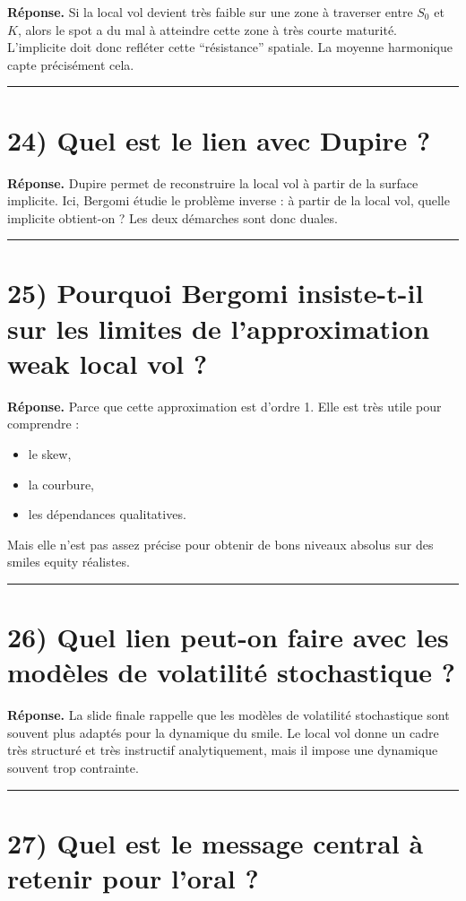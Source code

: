 \documentclass[11pt,a4paper]{article}
\begin{document}
\textbf{Réponse.}  
Si la local vol devient très faible sur une zone à traverser entre \(S_0\) et \(K\), alors le spot a du mal à atteindre cette zone à très courte maturité. L’implicite doit donc refléter cette “résistance” spatiale. La moyenne harmonique capte précisément cela.

\bigskip\hrule\bigskip

\section{24) Quel est le lien avec Dupire ?}

\textbf{Réponse.}  
Dupire permet de reconstruire la local vol à partir de la surface implicite.  
Ici, Bergomi étudie le problème inverse : à partir de la local vol, quelle implicite obtient-on ?  
Les deux démarches sont donc duales.

\bigskip\hrule\bigskip

\section{25) Pourquoi Bergomi insiste-t-il sur les limites de l’approximation weak local vol ?}

\textbf{Réponse.}  
Parce que cette approximation est d’ordre 1.  
Elle est très utile pour comprendre :
\begin{itemize}
\item le skew,
\item la courbure,
\item les dépendances qualitatives.
\end{itemize}

Mais elle n’est pas assez précise pour obtenir de bons niveaux absolus sur des smiles equity réalistes.

\bigskip\hrule\bigskip

\section{26) Quel lien peut-on faire avec les modèles de volatilité stochastique ?}

\textbf{Réponse.}  
La slide finale rappelle que les modèles de volatilité stochastique sont souvent plus adaptés pour la dynamique du smile.  
Le local vol donne un cadre très structuré et très instructif analytiquement, mais il impose une dynamique souvent trop contrainte.

\bigskip\hrule\bigskip

\section{27) Quel est le message central à retenir pour l’oral ?}
\end{document}
